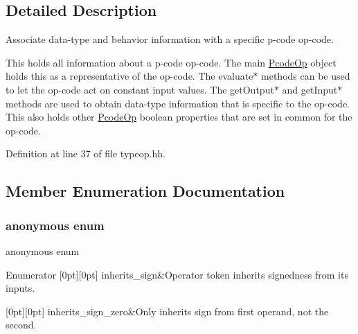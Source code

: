 \subsection{Detailed Description}
Associate data-\/type and behavior information with a specific p-\/code op-\/code. 

This holds all information about a p-\/code op-\/code. The main \mbox{\hyperlink{class_pcode_op}{Pcode\+Op}} object holds this as a representative of the op-\/code. The evaluate$\ast$ methods can be used to let the op-\/code act on constant input values. The get\+Output$\ast$ and get\+Input$\ast$ methods are used to obtain data-\/type information that is specific to the op-\/code. This also holds other \mbox{\hyperlink{class_pcode_op}{Pcode\+Op}} boolean properties that are set in common for the op-\/code. 

Definition at line 37 of file typeop.\+hh.



\subsection{Member Enumeration Documentation}
\mbox{\label{class_type_op_ae4453ff1926b197c1a6cc93de1afa2e2}} 
\subsubsection{\texorpdfstring{anonymous enum}{anonymous enum}}
{\footnotesize\ttfamily anonymous enum}

\begin{DoxyEnumFields}{Enumerator}
[0pt][0pt]{}\mbox{\label{class_type_op_ae4453ff1926b197c1a6cc93de1afa2e2a56c5af99e9a3391410a24e704e65914a}} 
inherits\+\_\+sign&Operator token inherits signedness from its inputs. \\
\hline

[0pt][0pt]{}\mbox{\label{class_type_op_ae4453ff1926b197c1a6cc93de1afa2e2ae19eeb20815c894d613cd03aa54047c1}} 
inherits\+\_\+sign\+\_\+zero&Only inherits sign from first operand, not the second. \\
\hline

\end{DoxyEnumFields}


